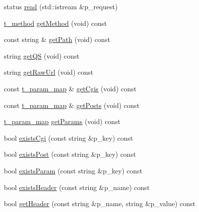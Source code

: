 \begin{DoxyCompactItemize}
\item 
status \hyperlink{classxtd_1_1network_1_1http_1_1Request_a050758a8848fb4190b305d955760fd79}{read} (std\+::istream \&p\+\_\+request)
\item 
\hyperlink{classxtd_1_1network_1_1http_1_1Request_a789d6d688af4e63cc725542fc7925627}{t\+\_\+method} \hyperlink{classxtd_1_1network_1_1http_1_1Request_af06004afe64f465edfb281407b7f3600}{get\+Method} (void) const 
\item 
const string \& \hyperlink{classxtd_1_1network_1_1http_1_1Request_a0006f0a88dccabdafe9dfed3627730f6}{get\+Path} (void) const 
\item 
string \hyperlink{classxtd_1_1network_1_1http_1_1Request_ac9aeee4365089901bd216350fdcbe3a2}{get\+QS} (void) const 
\item 
string \hyperlink{classxtd_1_1network_1_1http_1_1Request_a00428c206d17d2557d5ed3a46a2f139b}{get\+Raw\+Url} (void) const 
\item 
const \hyperlink{classxtd_1_1network_1_1http_1_1Request_a3cd6e9ac7c35897002582c4a3b84b17d}{t\+\_\+param\+\_\+map} \& \hyperlink{classxtd_1_1network_1_1http_1_1Request_a48687de33ff80c714d6bc0112aa23c56}{get\+Cgis} (void) const 
\item 
const \hyperlink{classxtd_1_1network_1_1http_1_1Request_a3cd6e9ac7c35897002582c4a3b84b17d}{t\+\_\+param\+\_\+map} \& \hyperlink{classxtd_1_1network_1_1http_1_1Request_a1a849dbe8e258e208325056ac46438c9}{get\+Posts} (void) const 
\item 
\hyperlink{classxtd_1_1network_1_1http_1_1Request_a3cd6e9ac7c35897002582c4a3b84b17d}{t\+\_\+param\+\_\+map} \hyperlink{classxtd_1_1network_1_1http_1_1Request_aac37ae370c601f66b17e1ef071081957}{get\+Params} (void) const 
\item 
bool \hyperlink{classxtd_1_1network_1_1http_1_1Request_a21fc278ee56175b527ae58c909ad97a3}{exists\+Cgi} (const string \&p\+\_\+key) const 
\item 
bool \hyperlink{classxtd_1_1network_1_1http_1_1Request_ae121fd7a302ea9bb1a3fe66f3cb7f696}{exists\+Post} (const string \&p\+\_\+key) const 
\item 
bool \hyperlink{classxtd_1_1network_1_1http_1_1Request_a8bc12470bb1a04d71d84ed1053551df9}{exists\+Param} (const string \&p\+\_\+key) const 
\item 
bool \hyperlink{classxtd_1_1network_1_1http_1_1Request_ad334cf225213389711b7524a2c637e38}{exists\+Header} (const string \&p\+\_\+name) const 
\item 
bool \hyperlink{classxtd_1_1network_1_1http_1_1Request_a99a0c9599f0d2bdc51f8e488fb4f78f4}{get\+Header} (const string \&p\+\_\+name, string \&p\+\_\+value) const 

\end{DoxyCompactItemize}

